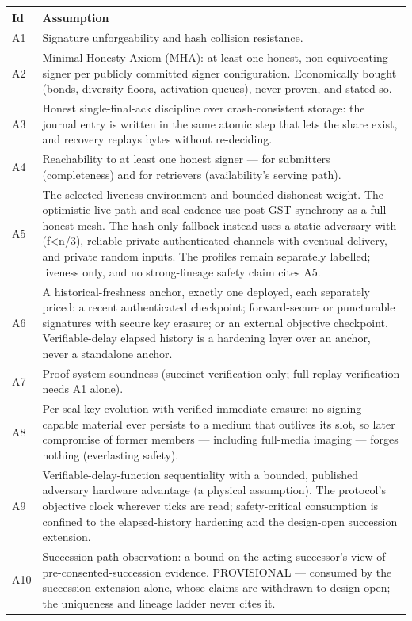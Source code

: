 \documentclass[11pt]{article}
\begin{document}
\begin{center}
\small
\begin{tabularx}{\textwidth}{>{\raggedright\arraybackslash}p{} X}
\toprule
\textbf{Id} & \textbf{Assumption} \\
\midrule
A1 & Signature unforgeability and hash collision resistance. \\
A2 & Minimal Honesty Axiom (MHA): at least one honest, non-equivocating
signer per publicly committed signer configuration. Economically bought
(bonds, diversity floors, activation queues), never proven, and stated so. \\
A3 & Honest single-final-ack discipline over crash-consistent storage:
the journal entry is written in the same atomic step that lets the share
exist, and recovery replays bytes without re-deciding. \\
A4 & Reachability to at least one honest signer --- for submitters
(completeness) and for retrievers (availability's serving path). \\
A5 & The selected liveness environment and bounded dishonest weight. The
optimistic live path and seal cadence use post-GST synchrony as a full honest
mesh. The hash-only fallback instead uses a static adversary with (f<n/3),
reliable private authenticated channels with eventual delivery, and private
random inputs. The profiles remain separately labelled; liveness only, and no
strong-lineage safety claim cites A5. \\
A6 & A historical-freshness anchor, exactly one deployed, each separately
priced: a recent authenticated checkpoint; forward-secure or puncturable
signatures with secure key erasure; or an external objective checkpoint.
Verifiable-delay elapsed history is a hardening layer over an anchor,
never a standalone anchor. \\
A7 & Proof-system soundness (succinct verification only; full-replay
verification needs A1 alone). \\
A8 & Per-seal key evolution with verified immediate erasure: no
signing-capable material ever persists to a medium that outlives its
slot, so later compromise of former members --- including full-media
imaging --- forges nothing (everlasting safety). \\
A9 & Verifiable-delay-function sequentiality with a bounded, published
adversary hardware advantage (a physical assumption). The protocol's
objective clock wherever ticks are read; safety-critical consumption is
confined to the elapsed-history hardening and the design-open succession
extension. \\
A10 & Succession-path observation: a bound on the acting successor's view
of pre-consented-succession evidence. PROVISIONAL --- consumed by the
succession extension alone, whose claims are withdrawn to design-open;
the uniqueness and lineage ladder never cites it. \\
\bottomrule
\end{tabularx}
\end{center}
\end{document}

